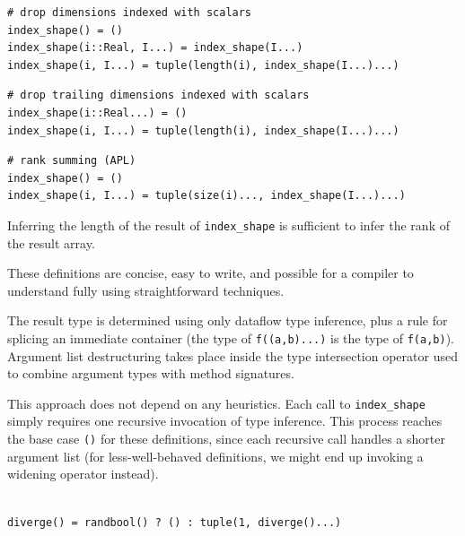 \documentclass[preprint]{sigplanconf}
\begin{document}

\begin{verbatim}
# drop dimensions indexed with scalars
index_shape() = ()
index_shape(i::Real, I...) = index_shape(I...)
index_shape(i, I...) = tuple(length(i), index_shape(I...)...)
\end{verbatim}

\begin{verbatim}
# drop trailing dimensions indexed with scalars
index_shape(i::Real...) = ()
index_shape(i, I...) = tuple(length(i), index_shape(I...)...)
\end{verbatim}

\begin{verbatim}
# rank summing (APL)
index_shape() = ()
index_shape(i, I...) = tuple(size(i)..., index_shape(I...)...)
\end{verbatim}

Inferring the length of the result of \texttt{index\_shape} is sufficient to
infer the rank of the result array.

These definitions are concise, easy to write, and possible for a compiler to
understand fully using straightforward techniques.



The result type is determined using only dataflow type inference, plus a rule
for splicing an immediate container (the type of \texttt{f((a,b)...)} is the
type of \texttt{f(a,b)}). Argument list destructuring takes place inside the
type intersection operator used to combine argument types with method
signatures.

This approach does not depend on any heuristics. Each call to
\texttt{index\_shape} simply requires one recursive invocation of type
inference. This process reaches the base case \texttt{()} for these
definitions, since each recursive call handles a shorter argument list (for
less-well-behaved definitions, we might end up invoking a widening operator
instead).


\begin{verbatim}

diverge() = randbool() ? () : tuple(1, diverge()...)

\end{verbatim}
\end{document}
